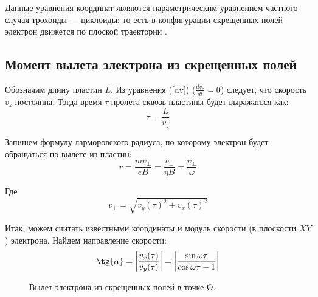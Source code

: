 Данные уравнения координат являются параметрическим уравнением частного случая трохоиды --- циклоиды: то есть в конфигурации скрещенных полей электрон движется по плоской траектории \cite{bellustin,arcimovich,andreev}.

\subsection{Момент вылета электрона из скрещенных полей}

Обозначим длину пластин $L$. Из уравнения (\ref{dv}) ($\frac{dv_z}{dt}=0$) следует, что скорость $v_z$ постоянна. Тогда время $\tau$ пролета сквозь пластины будет выражаться как:
\begin{equation}
	\tau=\frac{L}{v_z}
\end{equation}

Запишем формулу ларморовского радиуса, по которому электрон будет обращаться по вылете из пластин:
\begin{equation}
	r=\frac{mv_\perp}{eB}=\frac{v_\perp}{\eta{B}}=\frac{v_\perp}{\omega}
\end{equation}

Где 
\begin{equation}
	v_\perp=\sqrt{v_y(\tau)^2+v_x(\tau)^2}
\end{equation}

Итак, можем считать известными координаты и модуль скорости (в плоскости $XY$) электрона. 
Найдем направление скорости:
\begin{equation}
	\label{eq:tg_a}
	\tg{\alpha}=\left|\frac{v_x(\tau)}{v_y(\tau)}\right|=\left|\frac{\sin{\omega{\tau}}}{\cos\omega{\tau}-1}\right|
\end{equation}



\begin{figure}[ht!]
\vspace{1cm}
\centering
\begin{minipage}[ht!]{0.49\linewidth}
\end{minipage}
\hfill
\begin{minipage}[ht!]{0.49\linewidth}
\end{minipage}
\vspace{0.5cm}
\caption{Вылет электрона из скрещенных полей в точке O.}
\vspace{1cm}
\label{ris:vert_hor}
\end{figure}

